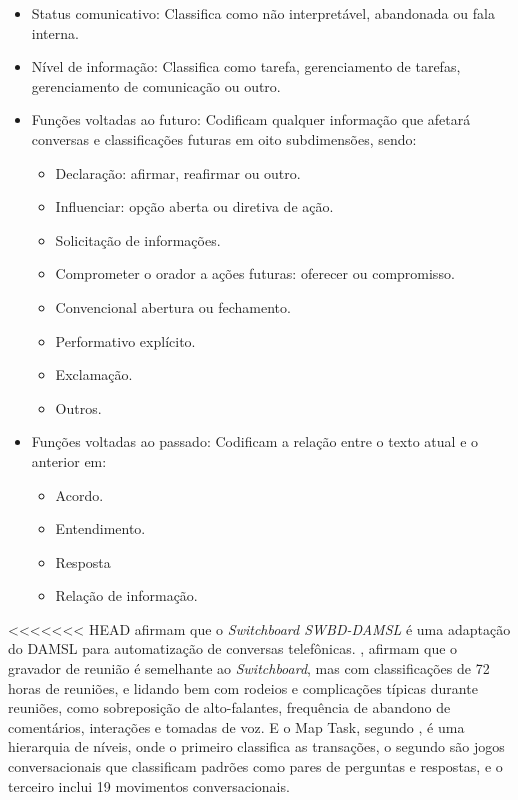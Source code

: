 \documentclass[
	12pt,				%
	oneside,
	a4paper,			%
	english,			%
	french,				%
	spanish,			%
	brazil				%
	]{abntex2}
\begin{document}
\begin{itemize}
	\item 
	Status comunicativo: Classifica como não interpretável, abandonada ou fala interna.
	\item 
	Nível de informação: Classifica como tarefa, gerenciamento de tarefas, gerenciamento de comunicação ou outro.
	\item 
	Funções voltadas ao futuro: Codificam qualquer informação que afetará conversas e classificações futuras em oito subdimensões, sendo:
	\begin{itemize}
		\item Declaração: afirmar, reafirmar ou outro.
		\item Influenciar: opção aberta ou diretiva de ação.
		\item Solicitação de informações.
		\item Comprometer o orador a ações futuras: oferecer ou compromisso.
		\item Convencional abertura ou fechamento.
		\item Performativo explícito.
		\item Exclamação.
		\item Outros.
	\end{itemize}
	\item Funções voltadas ao passado: Codificam a relação entre o texto atual e o anterior em:
	\begin{itemize}
		\item Acordo.
		\item Entendimento.
		\item Resposta
		\item Relação de informação.
	\end{itemize}

\end{itemize}

<<<<<<< HEAD
\textcite{dasml-switchboard} afirmam que o \emph{Switchboard SWBD-DAMSL} é uma adaptação do DAMSL para automatização de conversas telefônicas. \textcite{shriberg-etal-2004-icsi}, afirmam que o gravador de reunião é semelhante ao \emph{Switchboard}, mas com classificações de 72 horas de reuniões, e lidando bem com rodeios e complicações típicas durante reuniões, como sobreposição de alto-falantes, frequência de abandono de comentários, interações e tomadas de voz. E o Map Task, segundo \textcite{map-task}, é uma hierarquia de níveis, onde o primeiro classifica as transações, o segundo são jogos conversacionais que classificam padrões como pares de perguntas e respostas, e o terceiro inclui 19 movimentos conversacionais.
\end{document}
